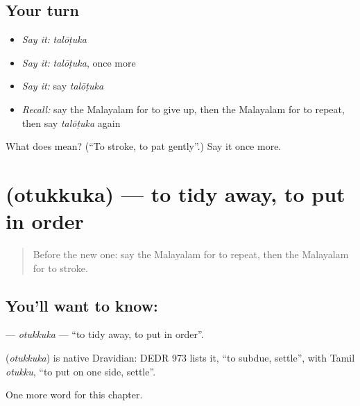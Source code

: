 \subsection*{Your turn}
\begin{itemize}
\raggedright
  \item \emph{Say it:} \emph{talōṭuka}
  \item \emph{Say it:} \emph{talōṭuka}, once more
  \item \emph{Say it:} say \emph{talōṭuka}
  \item \emph{Recall:} say the Malayalam for to give up, then the Malayalam for to repeat, then say \emph{talōṭuka} again
\end{itemize}

\begin{tcolorbox}[breakable,colback=teal!4,colframe=teal!35!black,title={Before you move on}]
What does  mean? (\textquotedblleft{}To stroke, to pat gently\textquotedblright{}.) Say it once more.
\end{tcolorbox}
\section[\texorpdfstring{\ml{ഒതുക്കുക} (otukkuka)}{ഒതുക്കുക (otukkuka)}]{ (otukkuka) — to tidy away, to put in order}

\label{lesson:ML-C311-otukkuka}



\begin{quote}
Before the new one: say the Malayalam for to repeat, then the Malayalam for to stroke.
\end{quote}

\subsection*{You'll want to know: }
\textbf{} — \emph{otukkuka} — \textquotedblleft{}to tidy away, to put in order\textquotedblright{}.

\begin{cousinweb}
\textbf{} (\emph{otukkuka}) is native Dravidian: DEDR 973 lists it, \textquotedblleft{}to subdue, settle\textquotedblright{}, with Tamil \emph{otukku}, \textquotedblleft{}to put on one side, settle\textquotedblright{}.
\end{cousinweb}

\begin{grammarlens}[title={What you've built}]
One more word for this chapter.
\end{grammarlens}

